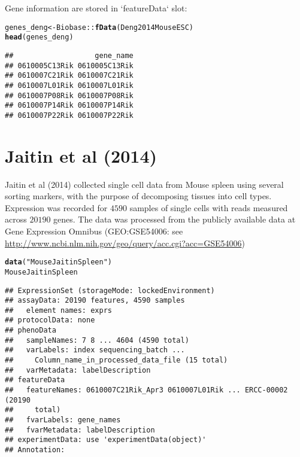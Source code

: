 \documentclass[12pt]{article}\usepackage[]{graphicx}\usepackage[usenames,dvipsnames]{color}
\makeatletter
\newcommand{\hlstr}[1]{\textcolor[rgb]{0.192,0.494,0.8}{#1}}%
\newcommand{\hlopt}[1]{\textcolor[rgb]{0,0,0}{#1}}%
\newcommand{\hlstd}[1]{\textcolor[rgb]{0.345,0.345,0.345}{#1}}%
\newcommand{\hlkwb}[1]{\textcolor[rgb]{0.69,0.353,0.396}{#1}}%
\newcommand{\hlkwd}[1]{\textcolor[rgb]{0.737,0.353,0.396}{\textbf{#1}}}%
\newenvironment{kframe}{%
 \def\at@end@of@kframe{}%
 \ifinner\ifhmode%
  \def\at@end@of@kframe{\end{minipage}}%
  \begin{minipage}{\columnwidth}%
 \fi\fi%
 \def\FrameCommand##1{\hskip\@totalleftmargin \hskip-\fboxsep
 \colorbox{shadecolor}{##1}\hskip-\fboxsep
     \hskip-\linewidth \hskip-\@totalleftmargin \hskip\columnwidth}%
 \MakeFramed {\advance\hsize-\width
   \@totalleftmargin\z@ \linewidth\hsize
   \@setminipage}}%
 {\par\unskip\endMakeFramed%
 \at@end@of@kframe}
\newenvironment{knitrout}{}{} %
\makeatother
\begin{document}
Gene information are stored in `featureData` slot:

\begin{knitrout}
\color{fgcolor}\begin{kframe}
\begin{alltt}
\hlstd{genes_deng} \hlkwb{<-} \hlstd{Biobase}\hlopt{::}\hlkwd{fData}\hlstd{(Deng2014MouseESC)}
\hlkwd{head}\hlstd{(genes_deng)}
\end{alltt}
\begin{verbatim}
##                   gene_name
## 0610005C13Rik 0610005C13Rik
## 0610007C21Rik 0610007C21Rik
## 0610007L01Rik 0610007L01Rik
## 0610007P08Rik 0610007P08Rik
## 0610007P14Rik 0610007P14Rik
## 0610007P22Rik 0610007P22Rik
\end{verbatim}
\end{kframe}
\end{knitrout}

\section{Jaitin et al (2014)}

Jaitin et al (2014) \cite{Jaitin2014} collected single cell data from Mouse
spleen using several sorting markers, with the purpose of decomposing tissues
into cell types. Expression was recorded for $4590$ samples of single cells with
reads measured across $20190$ genes. The data was processed from the publicly
available data at Gene Expression Omnibus (GEO:GSE54006: see
\url{http://www.ncbi.nlm.nih.gov/geo/query/acc.cgi?acc=GSE54006})

\begin{knitrout}
\color{fgcolor}\begin{kframe}
\begin{alltt}
\hlkwd{data}\hlstd{(}\hlstr{"MouseJaitinSpleen"}\hlstd{)}
\hlstd{MouseJaitinSpleen}
\end{alltt}
\begin{verbatim}
## ExpressionSet (storageMode: lockedEnvironment)
## assayData: 20190 features, 4590 samples 
##   element names: exprs 
## protocolData: none
## phenoData
##   sampleNames: 7 8 ... 4604 (4590 total)
##   varLabels: index sequencing_batch ...
##     Column_name_in_processed_data_file (15 total)
##   varMetadata: labelDescription
## featureData
##   featureNames: 0610007C21Rik_Apr3 0610007L01Rik ... ERCC-00002 (20190
##     total)
##   fvarLabels: gene_names
##   fvarMetadata: labelDescription
## experimentData: use 'experimentData(object)'
## Annotation:
\end{verbatim}
\end{kframe}
\end{knitrout}
\end{document}
